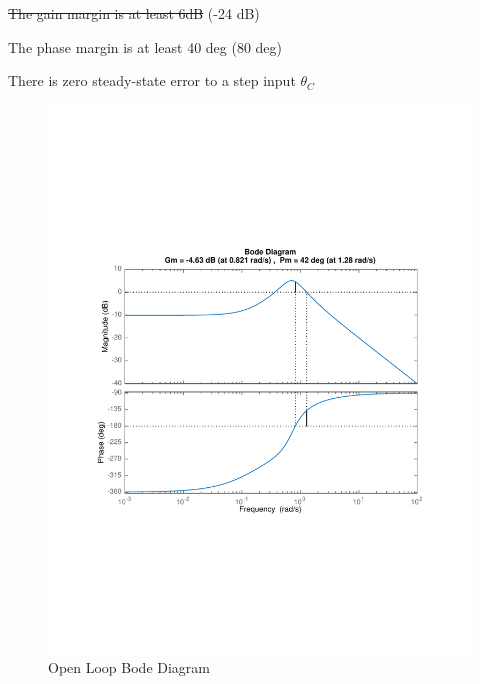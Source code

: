 \documentclass[12pt]{article}
\begin{document}
\sout{The gain margin is at least 6dB} (-24 dB)

The phase margin is at least 40 deg (80 deg)

There is zero steady-state error to a step input $\theta_C$


\begin{figure}[h]
\begin{center}
\includegraphics[width=1\textwidth]{figures/open_loop_bode}
\caption{Open Loop Bode Diagram}
\end{center}
\end{figure}
\end{document}
